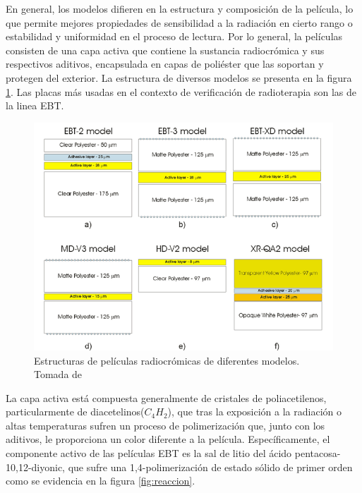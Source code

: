En general, los modelos difieren en la estructura y composición de la película, lo que permite mejores propiedades de sensibilidad a la radiación en cierto rango o estabilidad y uniformidad en el proceso de lectura. Por lo general, la películas consisten de una capa activa que contiene la sustancia radiocrómica y sus respectivos aditivos, encapsulada en capas de poliéster que las soportan y protegen del exterior. La estructura de diversos modelos se presenta en la figura \ref{fig:Estructuras}. Las placas más usadas en el contexto de verificación de radioterapia son las de la linea EBT.\\
\begin{figure}[H]
	\centering
	\includegraphics[width=\linewidth]{images/modelos.png}
	\caption{Estructuras de películas radiocrómicas de diferentes modelos. Tomada de \cite{Devic2016}}
	\label{fig:Estructuras}
\end{figure}

La capa activa está compuesta generalmente de cristales de poliacetilenos\cite{Williams2011}, particularmente de diacetelinos($C_4H_2$), que tras la exposición a la radiación o altas temperaturas sufren un proceso de polimerización que, junto con los aditivos, le proporciona un color diferente a la película. Específicamente, el componente activo de las películas EBT es la sal de litio del ácido pentacosa-10,12-diyonic, que sufre una 1,4-polimerización de estado sólido de primer orden como se evidencia en la figura \ref{fig:reaccion}.\\  

